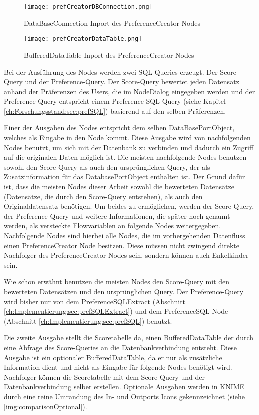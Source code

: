 \begin{figure}[H]
	\centering
	\texttt{[image: prefCreatorDBConnection.png]}
	\caption{DataBaseConnection Inport des PreferenceCreator Nodes}
	\label{img:prefCreatorDBConnection}
\end{figure}

\begin{figure}[H]
	\centering
	\texttt{[image: prefCreatorDataTable.png]}
	\caption{BufferedDataTable Inport des PreferenceCreator Nodes}
	\label{img:prefCreatorDataTable}
\end{figure}

Bei der Ausführung des Nodes werden zwei SQL-Queries erzeugt. Der Score-Query und der Preference-Query. Der Score-Query bewertet jeden Datensatz anhand der Präferenzen des Users, die im NodeDialog eingegeben werden und der Preference-Query entspricht einem Preference-SQL Query (siehe Kapitel \ref{ch:Forschungsstand:sec:prefSQL}) basierend auf den selben Präferenzen. 

Einer der Ausgaben des Nodes entspricht dem selben DataBasePortObject, welches als Eingabe in den Node kommt. Diese Ausgabe wird von nachfolgenden Nodes benutzt, um sich mit der Datenbank zu verbinden und dadurch ein Zugriff auf die originalen Daten möglich ist. Die meisten nachfolgende Nodes benutzen sowohl den Score-Query als auch den ursprünglichen Query, der als  Zusatzinformation für das DatabasePortObject enthalten ist. Der Grund dafür ist, dass die meisten Nodes dieser Arbeit sowohl die bewerteten Datensätze (Datensätze, die durch den Score-Query entstehen), als auch den Originaldatensatz benötigen. Um beides zu ermöglichen, werden der Score-Query, der Preference-Query und weitere Informationen, die später noch genannt werden, als versteckte Flowvariablen an folgende Nodes weitergegeben. Nachfolgende Nodes sind hierbei alle Nodes, die im vorhergehenden Datenfluss einen PreferenceCreator Node besitzen. Diese müssen nicht zwingend direkte Nachfolger des PreferenceCreator Nodes sein, sondern können auch Enkelkinder sein.

Wie schon erwähnt benutzen die meisten Nodes den Score-Query mit den bewerteten Datensätzen und den ursprünglichen Query. Der Preference-Query wird bisher nur von dem PreferenceSQLExtract (Abschnitt \ref{ch:Implementierung:sec:prefSQLExtract}) und dem PreferenceSQL Node (Abschnitt \ref{ch:Implementierung:sec:prefSQL}) benutzt. 

Die zweite Ausgabe stellt die Scoretabelle da, einen BufferedDataTable der durch eine Abfrage des Score-Queries an die Datenbankverbindung entsteht. Diese Ausgabe ist ein optionaler BufferedDataTable, da er nur als zusätzliche Information dient und nicht als Eingabe für folgende Nodes benötigt wird. Nachfolger können die Scoretabelle mit dem Score-Query und der Datenbankverbindung selber erstellen. Optionale Ausgaben werden in KNIME durch eine reine Umrandung des In- und Outports Icons gekennzeichnet (siehe \ref{img:comparisonOptional}).

